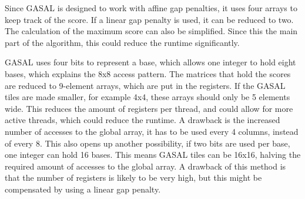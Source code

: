 \documentclass[../thesis.tex]{subfiles}
\begin{document}
Since GASAL is designed to work with affine gap penalties, it uses four arrays to keep track of the score.
If a linear gap penalty is used, it can be reduced to two.
The calculation of the maximum score can also be simplified.
Since this the main part of the algorithm, this could reduce the runtime significantly.

GASAL uses four bits to represent a base, which allows one integer to hold eight bases, which explains the 8x8 access pattern.
The matrices that hold the scores are reduced to 9-element arrays, which are put in the registers.
If the GASAL tiles are made smaller, for example 4x4, these arrays should only be 5 elements wide.
This reduces the amount of registers per thread, and could allow for more active threads, which could reduce the runtime.
A drawback is the increased number of accesses to the global array, it has to be used every 4 columns, instead of every 8.
This also opens up another possibility, if two bits are used per base, one integer can hold 16 bases.
This means GASAL tiles can be 16x16, halving the required amount of accesses to the global array.
A drawback of this method is that the number of registers is likely to be very high, but this might be compensated by using a linear gap penalty.
\end{document}
